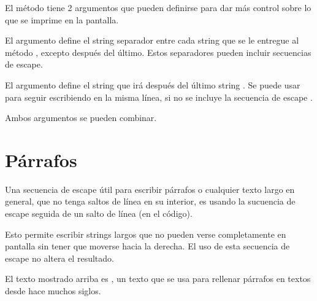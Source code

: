 
El método  tiene 2 argumentos que pueden definirse para dar más control sobre lo que se imprime en la pantalla.

El argumento  define el string separador entre cada string  que se le entregue al método , excepto después del último.
Estos separadores pueden incluir secuencias de escape.


El argumento  define el string que irá después del último string .
Se puede usar para seguir escribiendo en la misma línea, si no se incluye la secuencia de escape .


Ambos argumentos se pueden combinar.


\section{Párrafos}

Una secuencia de escape útil para escribir párrafos o cualquier texto largo en general, que no tenga saltos de línea en su interior, es usando la sucuencia de escape \ttt{\textbackslash} seguida de un salto de línea (en el código).

Esto permite escribir strings largos que no pueden verse completamente en pantalla sin tener que moverse hacia la derecha.
El uso de esta secuencia de escape no altera el resultado.


El texto mostrado arriba es , un texto que se usa para rellenar párrafos en textos desde hace muchos siglos.

\clearpage